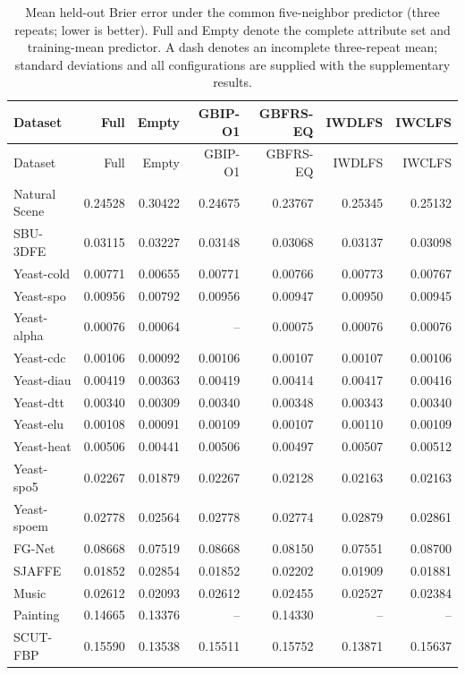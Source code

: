 \begin{longtable}{lrrrrrr}
\caption{Mean held-out Brier error under the common five-neighbor predictor (three repeats; lower is better). Full and Empty denote the complete attribute set and training-mean predictor. A dash denotes an incomplete three-repeat mean; standard deviations and all configurations are supplied with the supplementary results.}\label{tab:expanded-brier}\\
\toprule
Dataset & Full & Empty & GBIP-O1 & GBFRS-EQ & IWDLFS & IWCLFS \\
\midrule\endfirsthead
\toprule
Dataset & Full & Empty & GBIP-O1 & GBFRS-EQ & IWDLFS & IWCLFS \\
\midrule\endhead
Natural Scene & 0.24528 & 0.30422 & 0.24675 & 0.23767 & 0.25345 & 0.25132 \\
SBU-3DFE & 0.03115 & 0.03227 & 0.03148 & 0.03068 & 0.03137 & 0.03098 \\
Yeast-cold & 0.00771 & 0.00655 & 0.00771 & 0.00766 & 0.00773 & 0.00767 \\
Yeast-spo & 0.00956 & 0.00792 & 0.00956 & 0.00947 & 0.00950 & 0.00945 \\
Yeast-alpha & 0.00076 & 0.00064 & -- & 0.00075 & 0.00076 & 0.00076 \\
Yeast-cdc & 0.00106 & 0.00092 & 0.00106 & 0.00107 & 0.00107 & 0.00106 \\
Yeast-diau & 0.00419 & 0.00363 & 0.00419 & 0.00414 & 0.00417 & 0.00416 \\
Yeast-dtt & 0.00340 & 0.00309 & 0.00340 & 0.00348 & 0.00343 & 0.00340 \\
Yeast-elu & 0.00108 & 0.00091 & 0.00109 & 0.00107 & 0.00110 & 0.00109 \\
Yeast-heat & 0.00506 & 0.00441 & 0.00506 & 0.00497 & 0.00507 & 0.00512 \\
Yeast-spo5 & 0.02267 & 0.01879 & 0.02267 & 0.02128 & 0.02163 & 0.02163 \\
Yeast-spoem & 0.02778 & 0.02564 & 0.02778 & 0.02774 & 0.02879 & 0.02861 \\
FG-Net & 0.08668 & 0.07519 & 0.08668 & 0.08150 & 0.07551 & 0.08700 \\
SJAFFE & 0.01852 & 0.02854 & 0.01852 & 0.02202 & 0.01909 & 0.01881 \\
Music & 0.02612 & 0.02093 & 0.02612 & 0.02455 & 0.02527 & 0.02384 \\
Painting & 0.14665 & 0.13376 & -- & 0.14330 & -- & -- \\
SCUT-FBP & 0.15590 & 0.13538 & 0.15511 & 0.15752 & 0.13871 & 0.15637 \\

\end{longtable}
